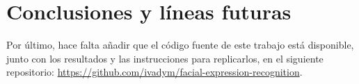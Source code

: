 \chapter{Conclusiones y líneas futuras} \label{Chapter:8}



Por último, hace falta añadir que el código fuente de este trabajo está disponible, junto con los resultados y las instrucciones para replicarlos, en el siguiente repositorio: \url{https://github.com/ivadym/facial-expression-recognition}.